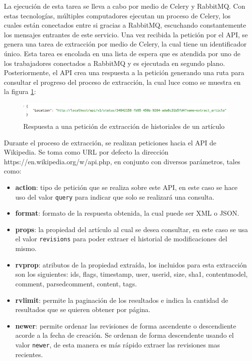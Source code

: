 La ejecución de esta tarea se lleva a cabo por medio de Celery y RabbitMQ.
Con estas tecnologías, múltiples computadores ejecutan un proceso de Celery, los
cuales están conectados entre si gracias a RabbitMQ, escuchando constantemente los mensajes entrantes de este servicio.
Una vez recibida la petición por el API, se genera una tarea de extracción por medio de Celery, la cual tiene un identificador único.
Esta tarea es encolada en una lista de
espera que es atendida por uno de los trabajadores conectados a RabbitMQ y es ejecutada en segundo plano.
Posteriormente, el API crea una respuesta a la petición generando una ruta para consultar el progreso
del proceso de extracción, la cual luce como se muestra en la figura \ref{fig:extract_response}:

\begin{figure}[H]
	\centering
		\includegraphics[width=1\textwidth]{figures/extract_response}
	\caption{Respuesta a una petición de extracción de historiales de un artículo}
	\label{fig:extract_response}
\end{figure}

Durante el proceso de extracción, se realizan peticiones hacia el API de Wikipedia.
Se toma como URL por defecto la dirección https://en.wikipedia.org/w/api.php, en conjunto con diversos parámetros, tales como:

\begin{itemize}
	\item \textbf{action}: tipo de petición que se realiza sobre este API, en este caso se hace uso del valor \texttt{query} para indicar que solo se realizará una consulta.

	\item \textbf{format}: formato de la respuesta obtenida, la cual puede ser XML o JSON.

	\item \textbf{props}: la propiedad del artículo al cual se desea consultar, en este caso se usa el valor \texttt{revisions} para poder extraer el historial de modificaciones del mismo.

	\item \textbf{rvprop}: atributos de la propiedad extraída, los incluidos para esta extracción son los siguientes: ids, flags, timestamp, user, userid, size, sha1, contentmodel, comment, parsedcomment, content, tags.

	\item \textbf{rvlimit}: permite la paginación de los resultados e indica la cantidad de resultados que se quieren obtener por página.

	\item \textbf{newer}: permite ordenar las revisiones de forma ascendente o descendiente acorde a la fecha de creación. Se ordenan de forma descendente usando el valor \texttt{newer}, de esta manera es más rápido extraer las revisiones mas recientes.
\end{itemize}

